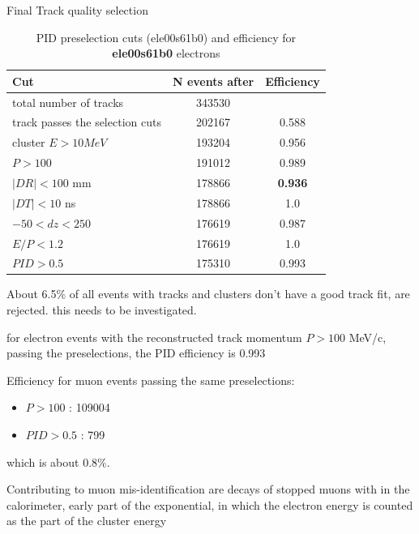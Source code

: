 \begin{table}[h!]
  \begin{center}
    \caption{Final Track quality selection}
    \label{tab:table1}
    \begin{tabular}{l|c|c} %
      \textbf{Cut}                    & \textbf{N events after } & \textbf{Efficiency }\\
      \hline
      total number of tracks          & 343530           &            \\
      \hline
      track passes the selection cuts & 202167           &   0.588    \\
      cluster $E > 10 MeV$            & 193204           &   0.956    \\
      $P > 100$                       & 191012           &   0.989    \\
      $|DR| < 100$ mm                 & 178866           &   {\color{red} \bf 0.936}    \\
      $|DT| < 10$ ns                  & 178866           &   1.0      \\
      $-50 < dz < 250$                & 176619           &   0.987    \\
      $ E/P < 1.2$                    & 176619           &   1.0      \\
      $PID >0.5$                      & 175310           &   0.993    \\
    \end{tabular}
  \end{center}
  \caption{
    PID preselection cuts (ele00s61b0) and efficiency for {\bf ele00s61b0} electrons 
  }
\end{table}

About 6.5\% of all events with tracks and clusters don't have a good track fit, are rejected.
this needs to be investigated.

for electron events with the reconstructed track momentum $P > 100$ MeV/c, passing the preselections, 
the PID efficiency is 0.993


\newpage
Efficiency for muon events passing the same preselections: 

\begin{itemize}
\item
  $P > 100$                       : 109004
\item 
  $PID >0.5$                      :    799
\end{itemize}

which is about 0.8\%.

Contributing to muon mis-identification are decays of stopped muons with in the calorimeter, early part of the exponential, 
in which the electron energy is counted as the part of the cluster energy
